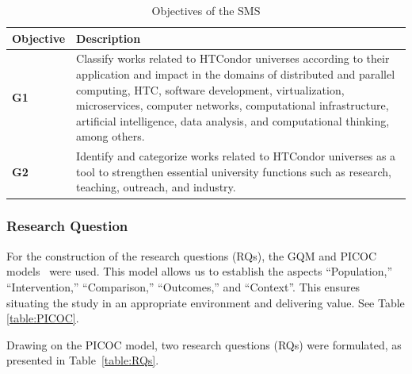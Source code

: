 \begin{table}[htbp]
	\centering
	\caption{Objectives of the SMS}
	\label{table:Goals}
	\renewcommand{\arraystretch}{1}  %
	\begin{tabular}{p{1cm}p{6.8cm}}
		\toprule
		\textbf{Objective} & \textbf{Description}                                                                                                                                                                                                                                                                                                                      \\
		\midrule
		\textbf{G1}        & Classify works related to HTCondor universes according to their application and impact in the domains of distributed and parallel computing, HTC, software development, virtualization, microservices, computer networks, computational infrastructure, artificial intelligence, data analysis, and computational thinking, among others. \\
		\addlinespace[0.8em]
		\textbf{G2}        & Identify and categorize works related to HTCondor universes as a tool to strengthen essential university functions such as research, teaching, outreach, and industry.                                                                                                                                                                    \\
		\bottomrule
	\end{tabular}
\end{table}

\subsubsection{Research Question}
For the construction of the research questions (RQs), the GQM and PICOC models~\cite{Needleman20026, Petticrew2008systematic} were used. This model allows us to establish the aspects ``Population,'' ``Intervention,'' ``Comparison,'' ``Outcomes,'' and ``Context''. This ensures situating the study in an appropriate environment and delivering value. See Table \ref{table:PICOC}.

Drawing on the PICOC model, two research questions (RQs) were formulated, as presented in Table~\ref{table:RQs}.

